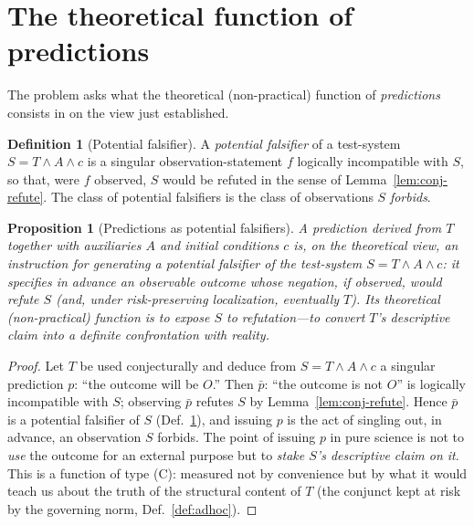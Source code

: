 \documentclass{amsart}
\theoremstyle{definition}
\newtheorem{definition}{Definition}
\theoremstyle{plain}
\newtheorem{proposition}{Proposition}
\begin{document}
\section{The theoretical function of predictions}

The problem asks what the theoretical (non-practical) function of
\emph{predictions} consists in on the view just established.

\begin{definition}[Potential falsifier]\label{def:falsifier}
A \emph{potential falsifier} of a test-system $S=T\wedge A\wedge c$ is a
singular observation-statement $f$ logically incompatible with $S$, so that,
were $f$ observed, $S$ would be refuted in the sense of
Lemma~\ref{lem:conj-refute}. The class of potential falsifiers is the class of
observations $S$ \emph{forbids}.
\end{definition}

\begin{proposition}[Predictions as potential
falsifiers]\label{prop:pred-falsifier}
A prediction derived from $T$ together with auxiliaries $A$ and initial
conditions $c$ is, on the theoretical view, an instruction for generating a
potential falsifier of the test-system $S=T\wedge A\wedge c$: it specifies in
advance an observable outcome whose negation, if observed, would refute $S$
(and, under risk-preserving localization, eventually $T$). Its theoretical
(non-practical) function is to \emph{expose $S$ to refutation}---to convert
$T$'s descriptive claim into a definite confrontation with reality.
\end{proposition}

\begin{proof}
Let $T$ be used conjecturally and deduce from $S=T\wedge A\wedge c$ a singular
prediction $p$: ``the outcome will be $O$.'' Then $\bar p$: ``the outcome is not
$O$'' is logically incompatible with $S$; observing $\bar p$ refutes $S$ by
Lemma~\ref{lem:conj-refute}. Hence $\bar p$ is a potential falsifier of $S$
(Def.~\ref{def:falsifier}), and issuing $p$ is the act of singling out, in
advance, an observation $S$ forbids. The point of issuing $p$ in pure science is
not to \emph{use} the outcome for an external purpose but to \emph{stake $S$'s
descriptive claim on it}. This is a function of type (C): measured not by
convenience but by what it would teach us about the truth of the structural
content of $T$ (the conjunct kept at risk by the governing norm,
Def.~\ref{def:adhoc}).
\end{proof}
\end{document}
